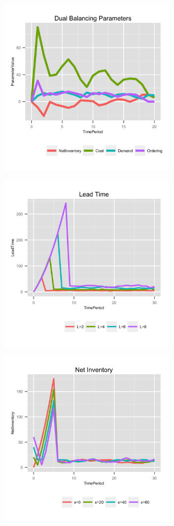 \documentclass{beamer}
\begin{document}
\begin{frame}
  \includegraphics[height=3.5in]{figures/DualBalancingParameters.png}
\end{frame}

\begin{frame}
  \includegraphics[height=3.5in]{figures/LeadTime.png}
\end{frame}

\begin{frame}
  \includegraphics[height=3.5in]{figures/NetInventory.png}
\end{frame}
\end{document}
